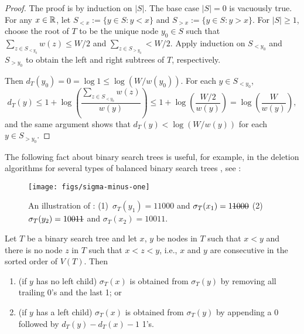 \documentclass[kpfonts]{patmorin}
\newcommand{\snote}[1]{\fcolorbox{red}{yellow}{#1}}
\let\le\leqslant
\let\ge\geqslant
\begin{document}
\begin{proof}
  The proof is by induction on $|S|$. The base case $|S|=0$ is vacuously true.
  For any $x\in\mathbb{R}$, let $S_{<x}:=\{y\in S: y < x\}$ and $S_{>x}:=\{y\in S: y>x\}$. For $|S|\ge 1$, choose the root of $T$ to be the unique node $y_0\in S$ such that $\sum_{z\in S_{<y_0}} w(z)\le W/2$ and $\sum_{z\in S_{>y_0}}< W/2$. Apply induction on $S_{<y_0}$ and $S_{>y_0}$ to obtain the left and right subtrees of $T$, respectively.
  
  Then $d_T(y_0)=0=\log 1\le \log (W/w(y_0))$.  For each $y\in S_{<y_0}$, 
  \[ 
    d_T(y) \le 1 + \log\left(\frac{\sum_{z\in S_{<y_0}}w(z)}{w(y)}\right) 
            \le 1 + \log \left(\frac{W/2}{w(y)}\right) 
            = \log \left(\frac{W}{w(y)}\right) , 
  \]
  and the same argument shows that $d_T(y) < \log (W/w(y))$ for each $y\in S_{>y_0}$.  
\end{proof}

The following fact about binary search trees is useful, for example, in the deletion algorithms for several types of balanced binary search trees \cite[Section~6.2.3]{morin:open}, see :

\begin{figure}
  \begin{center}
    \texttt{[image: figs/sigma-minus-one]}
  \end{center}
  \caption{An illustration of : (1)~$\sigma_T(y_1)=11000$ and $\sigma_T(x_1)=1\mbox{\sout{1000}}$ (2)~$\sigma_T(y_2)=10\mbox{\sout{011}}$ and $\sigma_T(x_2)=10011$.}
\end{figure}

\begin{obs}
  Let $T$ be a binary search tree and let $x$, $y$ be nodes in $T$ such that $x<y$ and there is no node $z$ in $T$ such that $x<z<y$, i.e., $x$ and $y$ are consecutive in the sorted order of $V(T)$.  Then
  \begin{enumerate}
    \item (if $y$ has no left child) $\sigma_T(x)$ is obtained from $\sigma_T(y)$ by removing all trailing 0's and the last 1; or
    \item (if $y$ has a left child) $\sigma_T(x)$ is obtained from $\sigma_T(y)$ by appending a 0 followed by $d_T(y)-d_T(x)-1$ 1's.
  \end{enumerate}
\end{obs}

\end{document}
